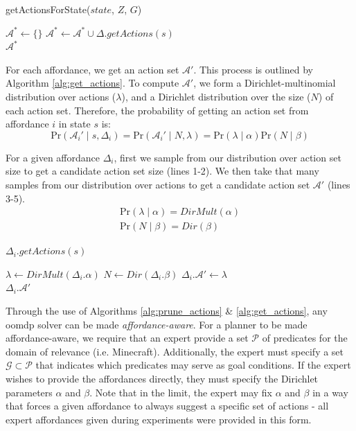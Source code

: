 \documentclass[letterpaper]{article}
\begin{document}
\begin{algorithm}
  \caption{getActionsForState($state$, $Z$, $G$)}
  \begin{algorithmic}[1]
    \State $\mathcal{A}^* \leftarrow \{\}$
    \State $\mathcal{A}^* \leftarrow \mathcal{A}^* \cup \Delta.getActions(s)$
    \EndIf
    \EndFor \\
    \Return $\mathcal{A}^*$
  \end{algorithmic}
  \label{alg:prune_actions}
\end{algorithm}

For each affordance, we get an action set $\mathcal{A}'$. This 
process is outlined by Algorithm \ref{alg:get_actions}. To compute $\mathcal{A}'$, we form a Dirichlet-multinomial distribution
over actions ($\lambda$), and a Dirichlet distribution over the size ($N$) of each action set. Therefore, the probability of getting an action set from affordance $i$ in state $s$ is:
\begin{equation}
\text{Pr}(\mathcal{A}_i' \mid s,\Delta_i) = \text{Pr}(\mathcal{A}_i' \mid N, \lambda) = \text{Pr}(\lambda \mid \alpha) \text{Pr}(N \mid \beta)
\end{equation}

For a given affordance $\Delta_i$, first we sample from our distribution over action set size to get a candidate action set size (lines 1-2). We then
take that many samples from our distribution over actions to get a candidate action set $\mathcal{A}'$ (lines 3-5).
\begin{align}
\text{Pr}(\lambda \mid \alpha) = DirMult(\alpha) \\
\text{Pr}(N \mid \beta) = Dir(\beta)
\end{align}

\begin{algorithm}
  \caption{$\Delta_i.getActions(s)$}
  \begin{algorithmic}[1]
    \State $\lambda \leftarrow DirMult(\Delta_i.\alpha)$
    \State $N \leftarrow Dir(\Delta_i.\beta)$
    \State $\Delta_i.\mathcal{A}' \leftarrow \lambda$
    \EndFor \\
    \Return $\Delta_i.\mathcal{A}'$
  \end{algorithmic}
  \label{alg:get_actions}
\end{algorithm}

Through the use of Algorithms \ref{alg:prune_actions} \& \ref{alg:get_actions}, any \gls{oomdp} solver can be made
{\it affordance-aware}. For a planner to be made affordance-aware, we require that an expert provide a set $\mathcal{P}$ of predicates
for the domain of relevance (i.e. Minecraft). Additionally, the expert must specify a set
$\mathcal{G} \subset \mathcal{P}$ that indicates which predicates may serve as goal conditions. If the expert wishes
to provide the affordances directly, they must specify the Dirichlet parameters $\alpha$ and $\beta$. Note that
in the limit, the expert may fix $\alpha$ and $\beta$ in a way that forces a given
affordance to always suggest a specific set of actions - all expert affordances given during experiments
were provided in this form.
\end{document}
